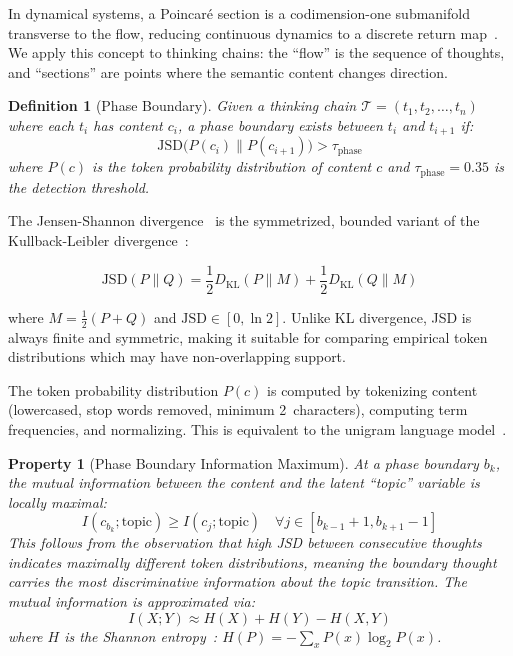 \documentclass[journal,10pt]{IEEEtran}
\newtheorem{definition}{Definition}
\newtheorem{property}{Property}
\begin{document}
In dynamical systems, a Poincar\'{e} section is a codimension-one submanifold transverse to the flow, reducing continuous dynamics to a discrete return map~\cite{poincare1890,strogatz2015}. We apply this concept to thinking chains: the ``flow'' is the sequence of thoughts, and ``sections'' are points where the semantic content changes direction.

\begin{definition}[Phase Boundary]
\label{def:phase}
Given a thinking chain $\mathcal{T} = (t_1, t_2, \ldots, t_n)$ where each $t_i$ has content $c_i$, a \emph{phase boundary} exists between $t_i$ and $t_{i+1}$ if:
\begin{equation}
\mathrm{JSD}\bigl(P(c_i) \| P(c_{i+1})\bigr) > \tau_{\mathrm{phase}}
\label{eq:phase}
\end{equation}
where $P(c)$ is the token probability distribution of content $c$ and $\tau_{\mathrm{phase}} = 0.35$ is the detection threshold.
\end{definition}

The Jensen-Shannon divergence~\cite{lin1991} is the symmetrized, bounded variant of the Kullback-Leibler divergence~\cite{kullback1951}:

\begin{equation}
\mathrm{JSD}(P \| Q) = \frac{1}{2} D_{\mathrm{KL}}(P \| M) + \frac{1}{2} D_{\mathrm{KL}}(Q \| M)
\label{eq:jsd}
\end{equation}

\noindent where $M = \frac{1}{2}(P + Q)$ and $\mathrm{JSD} \in [0, \ln 2]$. Unlike KL divergence, JSD is always finite and symmetric, making it suitable for comparing empirical token distributions which may have non-overlapping support.

The token probability distribution $P(c)$ is computed by tokenizing content (lowercased, stop words removed, minimum 2~characters), computing term frequencies, and normalizing. This is equivalent to the unigram language model~\cite{manning2008introduction}.

\begin{property}[Phase Boundary Information Maximum]
\label{prop:boundary}
At a phase boundary $b_k$, the mutual information between the content and the latent ``topic'' variable is locally maximal:
\begin{equation}
I(c_{b_k}; \mathrm{topic}) \geq I(c_j; \mathrm{topic}) \quad \forall j \in [b_{k-1}+1, b_{k+1}-1]
\label{eq:mutual}
\end{equation}
This follows from the observation that high JSD between consecutive thoughts indicates maximally different token distributions, meaning the boundary thought carries the most discriminative information about the topic transition. The mutual information is approximated via:
\begin{equation}
I(X; Y) \approx H(X) + H(Y) - H(X, Y)
\label{eq:mi}
\end{equation}
where $H$ is the Shannon entropy~\cite{shannon1948}: $H(P) = -\sum_{x} P(x) \log_2 P(x)$.
\end{property}
\end{document}
